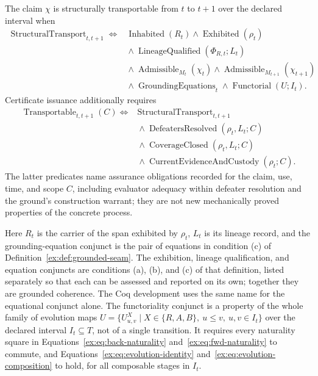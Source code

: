 \documentclass[smallextended,envcountsect,envcountsame,natbib]{svjour3}
\begin{document}
\begin{definition}\label{ex:def:nonvacuous-transport}
The claim $\chi$ is structurally transportable from $t$ to $t+1$ over the declared interval when
\[
\begin{aligned}
\operatorname{StructuralTransport}_{t,t+1} \Longleftrightarrow{}&
\operatorname{Inhabited}(R_t) \land \operatorname{Exhibited}(\rho_t) \\
&{}\land \operatorname{LineageQualified}(\Phi_{R,t};L_t) \\
&{}\land \operatorname{Admissible}_{M_t}(\chi_t) \land \operatorname{Admissible}_{M_{t+1}}(\chi_{t+1}) \\
&{}\land \operatorname{GroundingEquations}_t \land \operatorname{Functorial}(U;I_t).
\end{aligned}
\]
Certificate issuance additionally requires
\[
\begin{aligned}
\operatorname{Transportable}_{t,t+1}(C)\Longleftrightarrow{}&
\operatorname{StructuralTransport}_{t,t+1}\\
&{}\land\operatorname{DefeatersResolved}(\rho_t,L_t;C)\\
&{}\land\operatorname{CoverageClosed}(\rho_t,L_t;C)\\
&{}\land\operatorname{CurrentEvidenceAndCustody}(\rho_t;C).
\end{aligned}
\]
The latter predicates name assurance obligations recorded for the claim, use, time, and scope $C$, including evaluator adequacy within defeater resolution and the ground's construction warrant; they are not new mechanically proved properties of the concrete process.
\end{definition}

Here $R_t$ is the carrier of the span exhibited by $\rho_t$, $L_t$ is its lineage record, and the grounding-equation conjunct is the pair of equations in condition (c) of Definition~\ref{ex:def:grounded-seam}. The exhibition, lineage qualification, and equation conjuncts are conditions (a), (b), and (c) of that definition, listed separately so that each can be assessed and reported on its own; together they are grounded coherence. The Coq development uses the same name for the equational conjunct alone. The functoriality conjunct is a property of the whole family of evolution maps $U=\{U^X_{u,v}\mid X\in\{R,A,B\},\ u\leq v,\ u,v\in I_t\}$ over the declared interval $I_t\subseteq T$, not of a single transition. It requires every naturality square in Equations~\eqref{ex:eq:back-naturality} and~\eqref{ex:eq:fwd-naturality} to commute, and Equations~\eqref{ex:eq:evolution-identity} and~\eqref{ex:eq:evolution-composition} to hold, for all composable stages in $I_t$.
\end{document}
